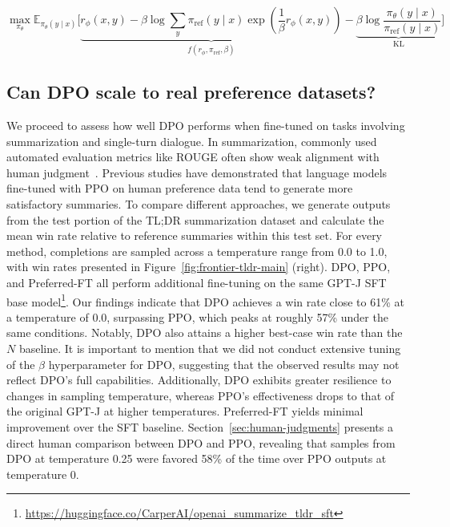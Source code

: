 \begin{equation}\label{eq:AC}
    \max_{\pi_{\theta}}\mathbb{E}_{\pi_{\theta}(y\mid x)}\bigg[\underbrace{r_{\phi}(x, y) -\beta\log\sum_{y}\pi_\text{ref}(y\mid x)\exp\left(\frac{1}{\beta}r_{\phi}(x, y)\right)}_{f(r_{\phi}, \pi_\text{ref}, \beta)} - \underbrace{\beta\log\frac{\pi_{\theta}(y\mid x)}{\pi_\text{ref}(y\mid x)}}_{\text{KL}}\bigg]
\end{equation}

\subsection{Can DPO scale to real preference datasets?}
\label{sec:dpo-real-datasets}
We proceed to assess how well DPO performs when fine-tuned on tasks involving summarization and single-turn dialogue. In summarization, commonly used automated evaluation metrics like ROUGE often show weak alignment with human judgment~\citep{stiennon2022learning}. Previous studies have demonstrated that language models fine-tuned with PPO on human preference data tend to generate more satisfactory summaries. To compare different approaches, we generate outputs from the test portion of the TL;DR summarization dataset and calculate the mean win rate relative to reference summaries within this test set. For every method, completions are sampled across a temperature range from 0.0 to 1.0, with win rates presented in Figure~\ref{fig:frontier-tldr-main} (right). DPO, PPO, and Preferred-FT all perform additional fine-tuning on the same GPT-J SFT base model\footnote{\url{https://huggingface.co/CarperAI/openai_summarize_tldr_sft}}. Our findings indicate that DPO achieves a win rate close to 61\% at a temperature of 0.0, surpassing PPO, which peaks at roughly 57\% under the same conditions. Notably, DPO also attains a higher best-case win rate than the $N$ baseline. It is important to mention that we did not conduct extensive tuning of the $\beta$ hyperparameter for DPO, suggesting that the observed results may not reflect DPO's full capabilities. Additionally, DPO exhibits greater resilience to changes in sampling temperature, whereas PPO's effectiveness drops to that of the original GPT-J at higher temperatures. Preferred-FT yields minimal improvement over the SFT baseline. Section~\ref{sec:human-judgments} presents a direct human comparison between DPO and PPO, revealing that samples from DPO at temperature 0.25 were favored 58\% of the time over PPO outputs at temperature 0.

